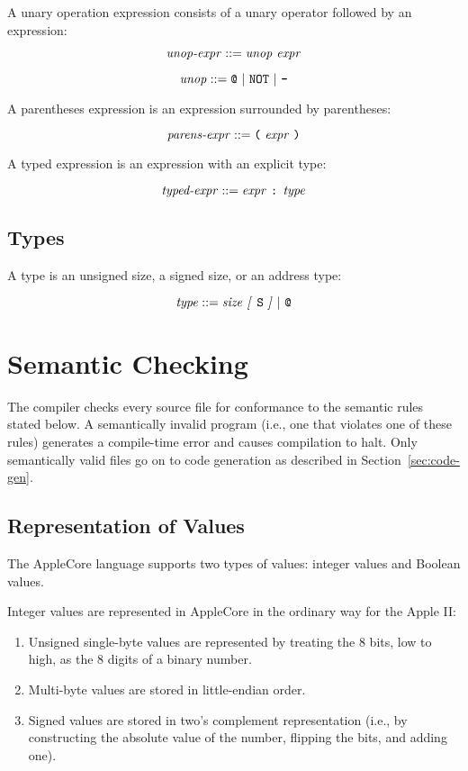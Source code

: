 \documentclass[10pt]{article}
\begin{document}
 A unary operation expression
consists of a unary operator followed by an expression:

$$\mbox{\textit{unop-expr}} ::= \mbox{\ensuremath{\mbox{\textit{unop}}} \ensuremath{\mbox{\textit{expr}}}}$$

$$\mbox{\textit{unop}} ::= \mbox{\texttt{@} $|$ \texttt{NOT} $|$ \texttt{-}}$$

 A parentheses expression is an
expression surrounded by parentheses:

$$\mbox{\textit{parens-expr}} ::= \mbox{\texttt{(} \ensuremath{\mbox{\textit{expr}}} \texttt{)}}$$

 A typed expression is an expression with
an explicit type:

$$\mbox{\textit{typed-expr}} ::= \mbox{\ensuremath{\mbox{\textit{expr}}} \texttt{:}
  \ensuremath{\mbox{\textit{type}}}}$$

\subsection{Types}

A type is an unsigned size, a signed size, or an address type:

$$\mbox{\textit{type}} ::= \mbox{\ensuremath{\mbox{\textit{size}}} \textit{[} \texttt{S} \textit{]} $|$ \texttt{@}}$$


\section{Semantic Checking}
\label{sec:semantics}

The compiler checks every source file for conformance to the semantic
rules stated below.  A semantically invalid program (i.e., one that
violates one of these rules) generates a compile-time error and causes
compilation to halt.  Only semantically valid files go on to code
generation as described in Section~\ref{sec:code-gen}.

\subsection{Representation of Values}
\label{sec:semantics:values}

The AppleCore language supports two types of values: integer values
and Boolean values.

 Integer values are represented in AppleCore
in the ordinary way for the Apple II:
%
\begin{enumerate}
%
\item Unsigned single-byte values are represented by treating the 8
  bits, low to high, as the 8 digits of a binary number.
%
\item Multi-byte values are stored in little-endian order.
%
\item Signed values are stored in two's complement representation
  (i.e., by constructing the absolute value of the number, flipping
  the bits, and adding one).
%
\end{enumerate}
\end{document}

